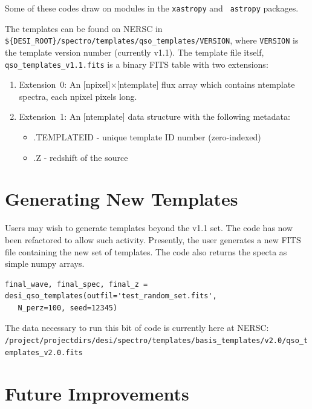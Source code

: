 \documentclass[11pt]{article}
\begin{document}
Some of these codes draw on modules in the {\tt xastropy} and {\tt
  astropy} packages.

\vskip 0.2in


The templates can be found on NERSC in {\tt
  \$\{DESI\_ROOT\}/spectro/templates/qso\_templates/VERSION}, where
{\tt VERSION} is the template version number (currently v1.1).  The
template file itself, {\tt qso\_templates\_v1.1.fits} is a binary FITS
table with two extensions:

\begin{enumerate}
\item Extension~0: An [{\sc npixel}]$\times$[{\sc ntemplate}] flux
  array which contains {\sc ntemplate} spectra, each {\sc npixel}
  pixels long.
\item Extension~1: An [{\sc ntemplate}] data structure with the
  following metadata:
\begin{itemize}
\item{.{\sc TEMPLATEID} - unique template ID number (zero-indexed)}
\item{.{\sc Z} - redshift of the source}
\end{itemize}
\end{enumerate}

\section{Generating New Templates}\label{sec:new_templ}

Users may wish to generate templates beyond the v1.1 set.
The code has now been refactored to allow such activity.
Presently, the user generates a new FITS file containing 
the new set of templates.  The code also returns the specta
as simple numpy arrays.  

\begin{Verbatim}[commandchars=\\\{\}]
final_wave, final_spec, final_z = desi_qso_templates(outfil='test_random_set.fits', 
   N_perz=100, seed=12345)
\end{Verbatim}

The data necessary to run this
bit of code is currently here at NERSC: \\
{\tt /project/projectdirs/desi/spectro/templates/basis\_templates/v2.0/qso\_templates\_v2.0.fits}

\section{Future Improvements}\label{sec:future}
\end{document}
